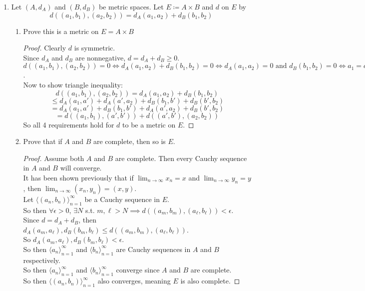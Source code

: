 \documentclass[14pt]{extarticle}
\begin{document}
\begin{enumerate}
		\item Let $(A,d_A)$ and $(B,d_B)$ be metric spaces. Let $E \coloneq A \times B$ and $d$ on $E$ by
		\[d((a_1,b_1),(a_2,b_2)) = d_A(a_1,a_2)+d_B(b_1,b_2)\]
		\begin{enumerate}
			\item Prove this is a metric on $E = A \times B$
			\begin{proof}
				Clearly $d$ is symmetric.\\
				Since $d_A$ and $d_B$ are nonnegative, $d=d_A+d_B \geq 0$.\\
				$d((a_1,b_1),(a_2,b_2))=0 \iff d_A(a_1,a_2)+d_B(b_1,b_2)=0 \iff d_A(a_1,a_2)=0 \text{ and } d_B(b_1,b_2)=0 \iff a_1=a_2 \text{ and } b_1=b_2$.\\
				Now to show triangle inequality:
				\[d((a_1,b_1),(a_2,b_2)) = d_A(a_1,a_2)+d_B(b_1,b_2)\]\[\leq d_A(a_1,a')+d_A(a',a_2)+d_B(b_1,b')+d_B(b',b_2)\]
				\[= d_A(a_1,a')+d_B(b_1,b')+d_A(a',a_2)+d_B(b',b_2)\]
				\[= d((a_1,b_1),(a',b'))+d((a',b'),(a_2,b_2))\]
				So all 4 requirements hold for $d$ to be a metric on $E$.
			\end{proof}
			\item Prove that if $A$ and $B$ are complete, then so is $E$.
			\begin{proof}
				Assume both $A$ and $B$ are complete. Then every Cauchy sequence in $A$ and $B$ will converge.\\
				It has been shown previously that if $\lim_{n\rightarrow\infty} x_n = x$ and $\lim_{n\rightarrow\infty} y_n = y$, then $\lim_{n\rightarrow\infty} (x_n,y_n) = (x,y)$.\\
				Let $\langle(a_n,b_n) \rangle_{n=1}^\infty$ be a Cauchy sequence in $E$.\\
				So then $\forall\epsilon>0$, $\exists N$ s.t. $m,\ell>N \implies d((a_m,b_m),(a_\ell,b_\ell)) < \epsilon$.
				Since $d = d_A+d_B$, then $d_A(a_m,a_\ell),d_B(b_m,b_\ell) \leq d((a_m,b_m),(a_\ell,b_\ell))$.\\
				So $d_A(a_m,a_\ell),d_B(b_m,b_\ell) < \epsilon$.\\
				So then $\langle a_n \rangle_{n=1}^\infty$ and $\langle b_n \rangle_{n=1}^\infty$ are Cauchy sequences in $A$ and $B$ respectively.\\
				So then $\langle a_n \rangle_{n=1}^\infty$ and $\langle b_n \rangle_{n=1}^\infty$ converge since $A$ and $B$ are complete.\\
				So then $\langle(a_n,b_n) \rangle_{n=1}^\infty$ also converges, meaning $E$ is also complete.
			\end{proof}

\end{enumerate}
\end{enumerate}
\end{document}
